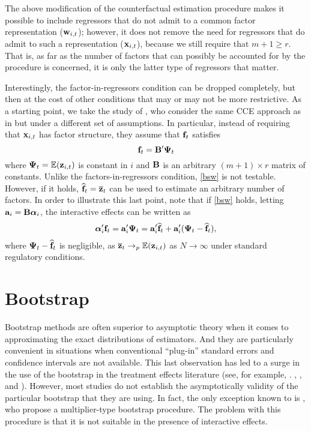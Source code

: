 \documentclass[12pt,fleqn]{article}
\begin{document}
The above modification of the counterfactual estimation procedure makes it possible to include regressors that do not admit to a common factor representation ($\mathbf{w}_{i,t}$); however, it does not remove the need for regressors that do admit to such a representation ($\mathbf{x}_{i,t}$), because we still require that $m+1 \geq r$. That is, as far as the number of factors that can possibly be accounted for by the procedure is concerned, it is only the latter type of regressors that matter.

Interestingly, the factor-in-regressors condition can be dropped completely, but then at the cost of other conditions that may or may not be more restrictive. As a starting point, we take the study of \citet{Brown_Schmidt_Wooldridge_2021}, who consider the same CCE approach as in \citet{pesaran2006estimation} but under a different set of assumptions. In particular, instead of requiring that $\mathbf{x}_{i,t}$ has factor structure, they assume that $\mathbf{f}_t$ satisfies
\begin{equation}\label{bsw}
    \mathbf{f}_t = \mathbf{B}'\boldsymbol{\Psi}_t
\end{equation}
where $\boldsymbol{\Psi}_t = \mathbb{E}(\mathbf{z}_{i,t})$ is constant in $i$ and $\mathbf{B}$ is an arbitrary $(m+1)\times r$ matrix of constants. Unlike the factors-in-regressors condition, \eqref{bsw} is not testable. However, if it holds, $\widehat{\mathbf{f}}_t = \overline{\mathbf{z}}_t$ can be used to estimate an arbitrary number of factors. In order to illustrate this last point, note that if \eqref{bsw} holds, letting $\mathbf{a}_i = \mathbf{B}\boldsymbol{\alpha}_i$, the interactive effects can be written as
\begin{align}
\boldsymbol{\alpha}_i'\mathbf{f}_t =  \mathbf{a}_i'\boldsymbol{\Psi}_t = \mathbf{a}_i'\widehat{\mathbf{f}}_t + \mathbf{a}_i'(\boldsymbol{\Psi}_t- \widehat{\mathbf{f}}_t) ,
\end{align}
where $\boldsymbol{\Psi}_t- \widehat{\mathbf{f}}_t$ is negligible, as $\overline{\mathbf{z}}_t \to_p \mathbb{E}(\mathbf{z}_{i,t})$ as $N\to \infty$ under standard regulatory conditions.

\section{Bootstrap}

Bootstrap methods are often superior to asymptotic theory when it comes to approximating the exact distributions of estimators. And they are particularly convenient in situations when conventional ``plug-in'' standard errors and confidence intervals are not available. This last observation has led to a surge in the use of the bootstrap in the treatment effects literature (see, for example, \citealp{Callaway_Karami_2020}. \citealp{chan2022pcdid}, \citealp{Gobillon_Magnac_2016}, and \citealp{Xu_2017}). However, most studies do not establish the asymptotically validity of the particular bootstrap that they are using. In fact, the only exception known to is \citet{Callaway_SantAnna_2020}, who propose a multiplier-type bootstrap procedure. The problem with this procedure is that it is not suitable in the presence of interactive effects.
\end{document}
